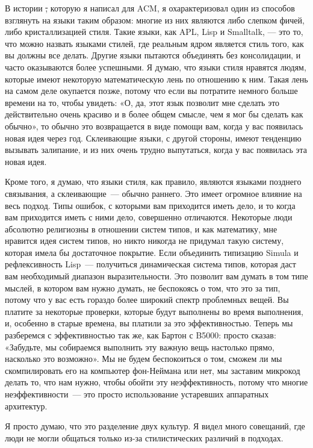 В истории \st, которую я написал для ACM, я охарактеризовал один из способов взглянуть 
на языки таким образом: многие из них являются либо слепком фичей, либо кристаллизацией стиля.
Такие языки, как APL, Lisp и Smalltalk, --- это то, что можно назвать языками стилей,
где реальным ядром является стиль того, как вы должны все делать.
Другие языки пытаются объединять без консолидации, и часто оказываются более успешными.
Я думаю, что языки стиля нравятся людям, которые имеют некоторую математическую лень по отношению к ним.
Такая лень на самом деле окупается позже, потому что если вы потратите немного больше 
времени на то, чтобы увидеть: «О, да, этот язык позволит мне сделать это действительно 
очень красиво и в более общем смысле, чем я мог бы сделать как обычно», 
то обычно это возвращается в виде помощи вам, когда у вас появилась новая идея через год.
Склеивающие языки, с другой стороны, имеют тенденцию вызывать залипание, 
и из них очень трудно выпутаться, когда у вас появилась эта новая идея.

Кроме того, я думаю, что языки стиля, как правило, являются языками позднего связывания, а склеивающие\ --- обычно раннего.
Это имеет огромное влияние на весь подход.
Типы ошибок, с которыми вам приходится иметь дело, и то когда вам приходится иметь с ними дело, совершенно отличаются.
Некоторые люди абсолютно религиозны в отношении систем типов, и как математику, мне нравится идея систем типов, 
но никто никогда не придумал такую систему, которая имела бы достаточное покрытие. 
Если объединить типизацию Simula и рефлексивность Lisp\ --- получиться динамическая система типов, 
которая даст вам необходимый диапазон выразительности.
Это позволит вам думать в том типе мыслей, в котором вам нужно думать, не беспокоясь о том, 
что это за тип, потому что у вас есть гораздо более широкий спектр проблемных вещей.
Вы платите за некоторые проверки, которые будут выполнены во время выполнения, 
и, особенно в старые времена, вы платили за это эффективностью.
Теперь мы разберемся с эффективностью так же, как Бартон с B5000: просто сказав: 
«Забудьте, мы собираемся выполнить эту важную вещь настолько прямо, насколько это возможно».
Мы не будем беспокоиться о том, сможем ли мы скомпилировать его на компьютер фон-Неймана или нет, 
мы заставим микрокод делать то, что нам нужно, чтобы обойти эту неэффективность, потому 
что многие неэффективности\ --- это просто использование устаревших аппаратных архитектур.

Я просто думаю, что это разделение двух культур. Я видел много совещаний, 
где люди не могли общаться только из-за стилистических различий в подходах.

